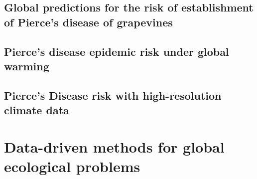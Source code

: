\documentclass[
	10pt, %
	fleqn, %
	a4paper, %
]{LegrandOrangeBook}
\begin{document}
\chapterspaceabove{6.75cm}
\chapterspacebelow{7.25cm}

\chapter{Global predictions for the risk of establishment of Pierce’s disease
  of grapevines}\label{ch:commsbio}
%

\chapterspaceabove{6.75cm}
\chapterspacebelow{7.25cm}

\chapter{Pierce's disease epidemic risk under global warming}
%

\chapterspaceabove{6.75cm}
\chapterspacebelow{7.25cm}

\chapter{Pierce's Disease risk with high-resolution climate data}

 {
  \hypersetup{hidelinks}
  \part{Data-driven methods for global ecological problems}
 }
\end{document}

